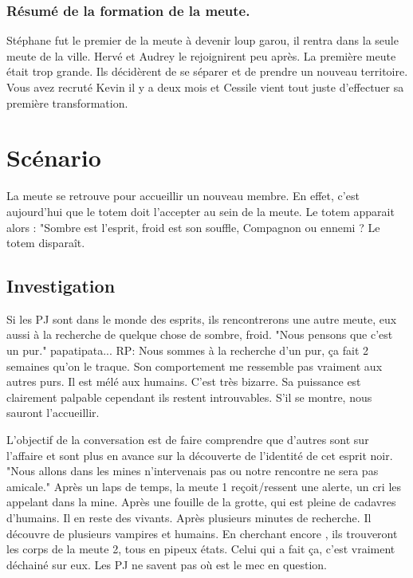 \documentclass[oneside,12pt]{book}
\begin{document}
\begin{flushleft}
\subsection{Résumé de la formation de la meute.}
Stéphane fut le premier de la meute à devenir loup garou, il rentra dans la seule meute de la ville. Hervé et Audrey le rejoignirent peu après. La première meute était trop grande. Ils décidèrent de se séparer et de prendre un nouveau territoire. Vous avez recruté Kevin il y a deux mois et Cessile vient tout juste d'effectuer sa première transformation.  

\chapter{Scénario}

La meute se retrouve pour accueillir un nouveau membre. En effet, c'est aujourd'hui que le totem doit l'accepter au sein de la meute. Le totem apparait alors :
"Sombre est l'esprit, froid est son souffle, Compagnon ou ennemi ? Le totem disparaît.
\section{Investigation}
Si les PJ sont dans le monde des esprits, ils rencontrerons une autre meute, eux aussi à la recherche de quelque chose de sombre, froid. "Nous pensons que c'est un pur." papatipata...
RP:
Nous sommes à la recherche d'un pur, ça fait 2 semaines qu'on le traque. Son comportement me ressemble pas vraiment aux autres purs.  Il est mélé aux humains. C'est très bizarre. Sa puissance est clairement palpable cependant ils restent introuvables. S'il se montre, nous sauront l'accueillir.


L'objectif de la conversation est de faire comprendre que d'autres sont sur l'affaire et sont plus en avance sur la découverte de l'identité de cet esprit noir. "Nous allons dans les mines n'intervenais pas ou notre rencontre ne sera pas amicale."
Après un laps de temps, la meute 1 reçoit/ressent une alerte, un cri les appelant dans la mine.   
Après une fouille de la grotte, qui est pleine de cadavres d'humains. Il en reste des vivants. Après plusieurs minutes de recherche. Il découvre de plusieurs vampires et humains. En cherchant encore , ils trouveront les corps de la meute 2, tous en pipeux états. Celui qui a fait ça, c'est vraiment déchainé sur eux. Les PJ ne savent pas où est le mec en question.  


	
\end{flushleft}
\end{document}
